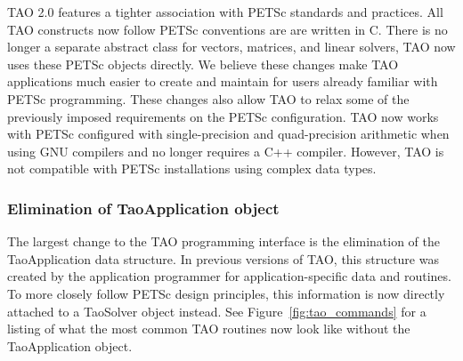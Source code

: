 TAO 2.0 features a tighter association with PETSc standards and practices.  All 
TAO constructs now follow PETSc conventions are are written in C.  There is 
no longer a separate abstract class for vectors, matrices, and linear 
solvers, TAO now uses these PETSc objects directly.  We believe these 
changes make TAO applications much easier to create and maintain for 
users already familiar with PETSc programming. These changes also allow 
TAO to relax some of the previously imposed requirements on the PETSc 
configuration.  TAO now works with PETSc configured with single-precision 
and quad-precision arithmetic when using GNU compilers and no longer 
requires a C++ compiler.  However, TAO is not compatible with PETSc 
installations using complex data types.

\subsubsection*{Elimination of TaoApplication object}

The largest change to the TAO programming interface is the elimination of the
TaoApplication data structure. In previous versions of TAO, this structure was 
created by the application programmer for application-specific data and 
routines.  To more closely follow PETSc design principles, this 
information is now directly attached to a TaoSolver object instead.  See 
Figure~\ref{fig:tao_commands} for a listing of what the most common TAO 
routines now look like without the TaoApplication object.


